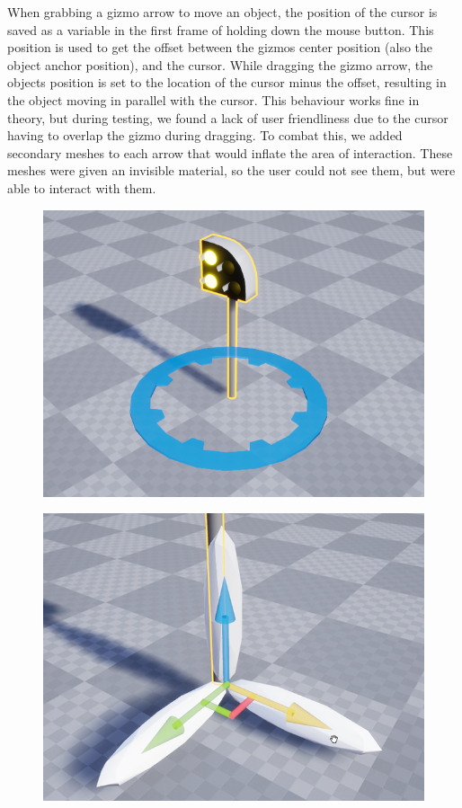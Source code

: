 When grabbing a gizmo arrow to move an object, the position of the cursor is saved as a variable in the first frame of holding down the mouse button. This position is used to get the offset between the gizmos center position (also the object anchor position), and the cursor. While dragging the gizmo arrow, the objects position is set to the location of the cursor minus the offset, resulting in the object moving in parallel with the cursor. This behaviour works fine in theory, but during testing, we found a lack of user friendliness due to the cursor having to overlap the gizmo during dragging. To combat this, we added secondary meshes to each arrow that would inflate the area of interaction. These meshes were given an invisible material, so the user could not see them, but were able to interact with them.

\begin{figure}[h]
\centering
\begin{minipage}{.5\textwidth}
  \centering
  \includegraphics[width=0.95\linewidth]{figures/Gizmo3.png}
  \label{fig:test1}
\end{minipage}%
\begin{minipage}{.5\textwidth}
  \centering
  \includegraphics[width=0.95\linewidth]{figures/Gizmo4.png}
  \label{fig:test2}
\end{minipage}
\end{figure}

